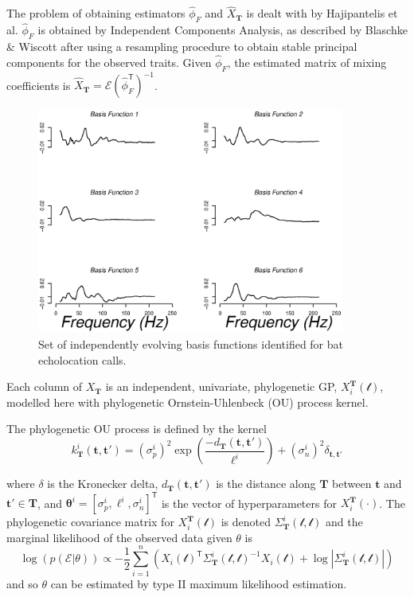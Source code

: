 \documentclass{ws-rv9x6}
\begin{document}
The problem of obtaining estimators \(\hat{\phi}_F\) and \(\hat{X}_{\mathbf{T}}\) is dealt with by Hajipantelis et al. \cite{hadjipantelis2013function} \(\hat{\phi}_F\) is obtained by Independent Components Analysis, as described by Blaschke \& Wiscott\cite{blaschke2004cubica} after using a resampling procedure to obtain stable principal components for the observed traits. Given \(\hat{\phi}_F\), the estimated matrix of mixing coefficients is \(\hat{X}_{\mathbf{T}} = \mathcal{E} (\hat{\phi}_F^{\mathsf{T}})^{-1}\). 

\begin{figure}[h]
	\centering
	\includegraphics[width = 0.9\textwidth]{../Figures/basis.eps}
	\caption{Set of independently evolving basis functions identified for bat echolocation calls. }
\end{figure}

Each column of \(X_{\mathbf{T}}\) is an independent, univariate, phylogenetic GP, \(X_i^{\mathbf{T}}(\mathcal{t})\), modelled here with phylogenetic Ornstein-Uhlenbeck (OU) process kernel.

The phylogenetic OU process is defined by the kernel
\begin{equation}
k_{\mathbf{T}}^i(\mathbf{t}, \mathbf{t}') = (\sigma_p^i)^2 \exp \left( \frac{-d_{\mathbf{T}}(\mathbf{t}, \mathbf{t}')}{\ell^i} \right) + (\sigma_n^i)^2 \delta_{\mathbf{t}, \mathbf{t}'}
\label{eqn:oukernel}
\end{equation}

where \(\delta\) is the Kronecker delta, \(d_{\mathbf{T}}(\mathbf{t}, \mathbf{t}')\) is the distance along \(\mathbf{T}\) between \(\mathbf{t}\) and \(\mathbf{t}' \in \mathbf{T}\), and \(\mathbf{\theta}^i = [\sigma_p^i, \ell^i, \sigma_n^i]^{\mathsf{T}}\) is the vector of hyperparameters for \(X_i^{\mathbf{T}}(\cdot)\). The phylogenetic covariance matrix for \(X_i^{\mathbf{T}}(\mathcal{t})\) is denoted \(\Sigma_{\mathbf{T}}^i(\mathcal{t}, \mathcal{t})\) and the marginal likelihood of the observed data given \(\theta\) is
\begin{equation}
\log(p(\mathcal{E} | \theta)) \propto -\frac{1}{2} \sum_{i = 1}^{n} \left( X_i(\mathcal{t})^{\mathsf{T}} \Sigma_{\mathbf{T}}^i(\mathcal{t}, \mathcal{t})^{-1}  X_i(\mathcal{t}) + \log |\Sigma_{\mathbf{T}}^i(\mathcal{t}, \mathcal{t})|    \right)
\label{eqn:t2mle}
\end{equation}
and so \(\theta\) can be estimated by type II maximum likelihood estimation.
\end{document}
